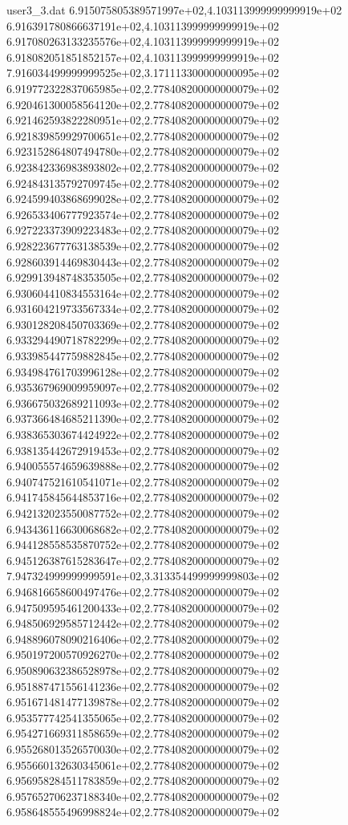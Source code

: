 \begin{filecontents}{user3_3.dat}
6.915075805389571997e+02,4.103113999999999919e+02
6.916391780866637191e+02,4.103113999999999919e+02
6.917080263133235576e+02,4.103113999999999919e+02
6.918082051851852157e+02,4.103113999999999919e+02
7.916034499999999525e+02,3.171113300000000095e+02
6.919772322837065985e+02,2.778408200000000079e+02
6.920461300058564120e+02,2.778408200000000079e+02
6.921462593822280951e+02,2.778408200000000079e+02
6.921839859929700651e+02,2.778408200000000079e+02
6.923152864807494780e+02,2.778408200000000079e+02
6.923842336983893802e+02,2.778408200000000079e+02
6.924843135792709745e+02,2.778408200000000079e+02
6.924599403868699028e+02,2.778408200000000079e+02
6.926533406777923574e+02,2.778408200000000079e+02
6.927223373909223483e+02,2.778408200000000079e+02
6.928223677763138539e+02,2.778408200000000079e+02
6.928603914469830443e+02,2.778408200000000079e+02
6.929913948748353505e+02,2.778408200000000079e+02
6.930604410834553164e+02,2.778408200000000079e+02
6.931604219733567334e+02,2.778408200000000079e+02
6.930128208450703369e+02,2.778408200000000079e+02
6.933294490718782299e+02,2.778408200000000079e+02
6.933985447759882845e+02,2.778408200000000079e+02
6.934984761703996128e+02,2.778408200000000079e+02
6.935367969009959097e+02,2.778408200000000079e+02
6.936675032689211093e+02,2.778408200000000079e+02
6.937366484685211390e+02,2.778408200000000079e+02
6.938365303674424922e+02,2.778408200000000079e+02
6.938135442672919453e+02,2.778408200000000079e+02
6.940055574659639888e+02,2.778408200000000079e+02
6.940747521610541071e+02,2.778408200000000079e+02
6.941745845644853716e+02,2.778408200000000079e+02
6.942132023550087752e+02,2.778408200000000079e+02
6.943436116630068682e+02,2.778408200000000079e+02
6.944128558535870752e+02,2.778408200000000079e+02
6.945126387615283647e+02,2.778408200000000079e+02
7.947324999999999591e+02,3.313354499999999803e+02
6.946816658600497476e+02,2.778408200000000079e+02
6.947509595461200433e+02,2.778408200000000079e+02
6.948506929585712442e+02,2.778408200000000079e+02
6.948896078090216406e+02,2.778408200000000079e+02
6.950197200570926270e+02,2.778408200000000079e+02
6.950890632386528978e+02,2.778408200000000079e+02
6.951887471556141236e+02,2.778408200000000079e+02
6.951671481477139878e+02,2.778408200000000079e+02
6.953577742541355065e+02,2.778408200000000079e+02
6.954271669311858659e+02,2.778408200000000079e+02
6.955268013526570030e+02,2.778408200000000079e+02
6.955660132630345061e+02,2.778408200000000079e+02
6.956958284511783859e+02,2.778408200000000079e+02
6.957652706237188340e+02,2.778408200000000079e+02
6.958648555496998824e+02,2.778408200000000079e+02

\end{filecontents}
